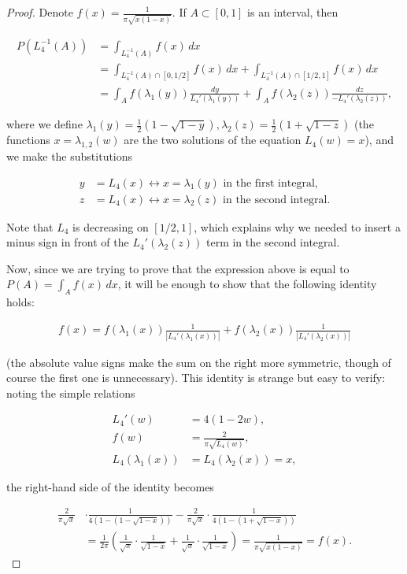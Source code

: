 \documentclass[11pt]{report}
\theoremstyle{plain}
\theoremstyle{definition}
\begin{document}
\begin{proof}
Denote $f(x)=\frac{1}{\pi \sqrt{x(1-x)}}$. If
$A \subset [0,1]$ is an interval, then

\begin{align*}
P(L_4^{-1}(A)) &= \int_{L_4^{-1}(A)} f(x)\,dx \\ &=
\int_{L_4^{-1}(A)\cap\left[0,1/2\right]} f(x)\,dx +
\int_{L_4^{-1}(A)\cap\left[1/2,1\right]} f(x)\,dx \\
&= \int_A f(\lambda_1(y))\frac{dy}{L_4'(\lambda_1(y))} + \int_A f(\lambda_2(z)) \frac{dz}{-L_4'(\lambda_2(z))},
\end{align*}

\noindent where we define
$\lambda_1(y)=\tfrac12(1-\sqrt{1-y}),
\lambda_2(z)=\tfrac12(1+\sqrt{1-z})$
(the functions $x=\lambda_{1,2}(w)$ are the two
solutions of the equation $L_4(w)=x$), and we make the
substitutions

\begin{align*}
y&=L_4(x) \leftrightarrow x=\lambda_1(y) \textrm{ in the first integral,} \\ z&=L_4(x) \leftrightarrow x=\lambda_2(z) \textrm{ in the second integral}.
\end{align*}

\noindent Note that $L_4$ is decreasing on $[1/2,1]$, which
explains why we needed to insert a minus sign in front
of the $L_4'(\lambda_2(z))$ term in the second
integral.

Now, since we are trying to prove that the expression
above is equal to $P(A)=\int_A f(x)\,dx$, it will be
enough to show that the following identity holds:

\begin{align*}
f(x) = f(\lambda_1(x))\frac{1}{|L_4'(\lambda_1(x))|} + f(\lambda_2(x))\frac{1}{|L_4'(\lambda_2(x))|}
\end{align*}

\noindent (the absolute value signs make the sum on the right
more symmetric, though of course the first one is
unnecessary). This identity is strange but easy to
verify: noting the simple relations

\begin{align*}
L_4'(w) &=4(1-2w), \\ f(w)&=\frac{2}{\pi\sqrt{L_4(w)}}, \\ L_4(\lambda_1(x)) &= L_4(\lambda_2(x)) =x,
\end{align*}

\noindent the right-hand side of the identity becomes

\begin{align*}
\frac{2}{\pi \sqrt{x}} &\cdot \frac{1}{4(1-(1-\sqrt{1-x}))}
-
\frac{2}{\pi \sqrt{x}}\cdot \frac{1}{4(1-(1+\sqrt{1-x}))} \\
& =
\frac{1}{2\pi} \left( \frac{1}{\sqrt{x}}\cdot \frac{1}{\sqrt{1-x}} +
\frac{1}{\sqrt{x}}\cdot \frac{1}{\sqrt{1-x}} \right) = \frac{1}{\pi\sqrt{x(1-x)}} = f(x).
\end{align*}

\end{proof}
\end{document}
